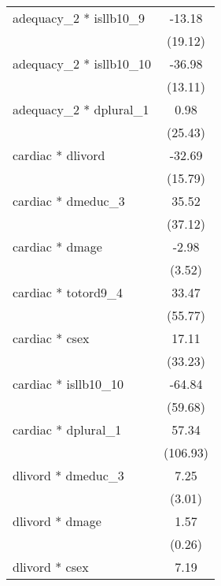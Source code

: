 {\begin{tabular}{l*{1}{c}}
adequacy\_2 * isllb10\_9                            &      -13.18\\
                                                  &     (19.12)\\
adequacy\_2 * isllb10\_10                           &      -36.98\\
                                                  &     (13.11)\\
adequacy\_2 * dplural\_1                            &        0.98\\
                                                  &     (25.43)\\
cardiac * dlivord                                 &      -32.69\\
                                                  &     (15.79)\\
cardiac * dmeduc\_3                                &       35.52\\
                                                  &     (37.12)\\
cardiac * dmage                                   &       -2.98\\
                                                  &      (3.52)\\
cardiac * totord9\_4                               &       33.47\\
                                                  &     (55.77)\\
cardiac * csex                                    &       17.11\\
                                                  &     (33.23)\\
cardiac * isllb10\_10                              &      -64.84\\
                                                  &     (59.68)\\
cardiac * dplural\_1                               &       57.34\\
                                                  &    (106.93)\\
dlivord * dmeduc\_3                                &        7.25\\
                                                  &      (3.01)\\
dlivord * dmage                                   &        1.57\\
                                                  &      (0.26)\\
dlivord * csex                                    &        7.19\\

\end{tabular}}
